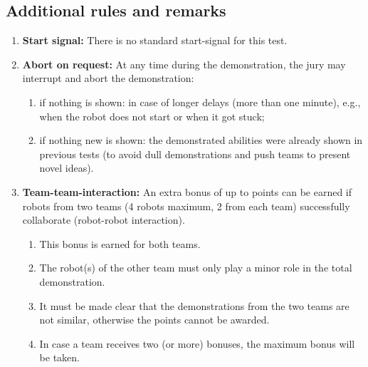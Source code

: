 \subsection{Additional rules and remarks}
\begin{enumerate}
	\item \textbf{Start signal:} There is no standard start-signal for this test.
	\item \textbf{Abort on request:} At any time during the demonstration, the jury may interrupt and abort the demonstration:
	\begin{enumerate}
		\item if nothing is shown: in case of longer delays (more than one minute), e.g., when the robot does not start or when it got stuck;
		\item if nothing new is shown: the demonstrated abilities were already shown in previous tests (to avoid dull demonstrations and push teams to present novel ideas).
	\end{enumerate}

	\item \textbf{Team-team-interaction:}  An extra bonus of up to \bonusRobotCoop points can be earned if robots from two teams (4 robots maximum, 2 from each team) successfully collaborate (robot-robot interaction).
	\begin{enumerate}
		\item This bonus is earned for both teams.
		\item The robot(s) of the other team must only play a minor role in the total demonstration.
		\item It must be made clear that the demonstrations from the two teams are not similar, otherwise the points cannot be awarded.
		\item In case a team receives two (or more) bonuses, the maximum bonus will be taken.
	\end{enumerate}
\end{enumerate}



